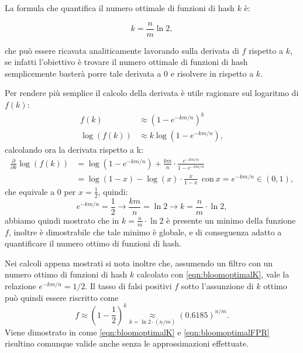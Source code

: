 \documentclass[../../main.tex]{subfiles}
\begin{document}
La formula che quantifica il numero ottimale di funzioni di hash $k$ è:

\begin{equation}
    k = \frac{n}{m}\ln{2} ,
    \label{eqn:bloomoptimalK}
\end{equation}

che può essere ricavata analiticamente lavorando sulla derivata di $f$ rispetto a $k$,  se infatti l'obiettivo è trovare il numero ottimale di funzioni di hash semplicemente basterà porre tale derivata a 0 e risolvere in rispetto a $k$.

Per rendere più semplice il calcolo della derivata è utile ragionare sul logaritmo di $f(k)$:
\begin{align*}
    f(k) & \approx \left(1 - e^{-km/n}\right)^k\\
    \log(f(k)) & \approx k \log\left(1 - e^{-km/n}\right),
\end{align*}
calcolando ora la derivata rispetto a k:
\begin{align*}
    \frac{\partial}{\partial k} \log(f(k)) & = \log(1 - e^{-km/n}) + \frac{km}{n} \cdot \frac{e^{-km/n}}{1 - e^{-km/n}}\\
    &= \log(1 - x) - \log(x) \cdot \frac{x}{1 - x} \ \ \text{con} \ x = e^{-km/n} \in (0,1),
\end{align*}
che equivale a 0 per $ x = \frac{1}{2}$, quindi: 
\[e^{-km/n} = \frac{1}{2} \rightarrow \frac{km}{n} = \ln2 \rightarrow k = \frac{n}{m}\cdot \ln2 ,\]
abbiamo quindi mostrato che in $k = \frac{n}{m}\cdot \ln2$ è presente un minimo della funzione $f$, inoltre è dimostrabile che tale minimo è globale, e di conseguenza adatto a quantificare il numero ottimo di funzioni di hash.

Nei calcoli appena mostrati si nota inoltre che, assumendo un filtro con un numero ottimo di funzioni di hash $k$ calcolato con \eqref{eqn:bloomoptimalK}, vale la relazione $e^{-km/n} = 1/2$. Il tasso di falsi positivi $f$ sotto l'assunzione di $k$ ottimo può quindi essere riscritto come
\begin{equation}
f \approx \left(1 - \frac{1}{2}\right)^k \underset{k = \ln{2} \cdot \left(n/m\right)}{\approx} (0.6185)^{n/m}.
\label{eqn:bloomoptimalFPR}
\end{equation}
Viene dimostrato in \cite{Broder2005} come \eqref{eqn:bloomoptimalK} e \eqref{eqn:bloomoptimalFPR} risultino comunque valide anche senza le approssimazioni effettuate.
\end{document}
